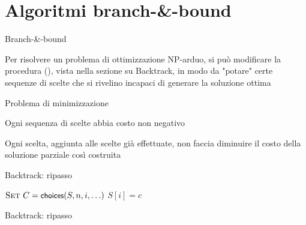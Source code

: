 \section{Algoritmi branch-\&-bound}

\begin{frame}{Branch-\&-bound}

\begin{myboxtitle}
Per risolvere un problema di ottimizzazione NP-arduo, si può modificare la
procedura \enumerazione(), vista nella sezione su Backtrack, in modo da
"potare" certe sequenze di scelte che si rivelino incapaci di
generare la soluzione ottima
\end{myboxtitle}

\bigskip
{}
\BIL
\item Problema di minimizzazione
\item Ogni sequenza di scelte abbia costo non negativo
\item Ogni scelta, aggiunta alle scelte già effettuate, non faccia 
diminuire il costo della soluzione parziale così costruita
\EIL
    
\end{frame}

\begin{frame}{Backtrack: ripasso}
    
\begin{Procedure}
\caption[A]{\BOOLEAN\ \enumerazione($\Item[\,]\ S$, \INTEGER $n$, \INTEGER\ $i$, \mldots)}
$\textsc{Set}\ C = \textsf{{\small choices}}(S, n, i, \ldots)$
{
  $S[i] = c$\;
  {
  }
}
\Return \FALSE\;
\end{Procedure}
        
\end{frame}

\begin{frame}{Backtrack: ripasso}
    
    
\end{frame}

